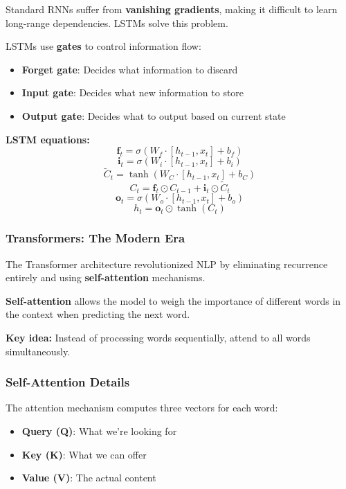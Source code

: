\documentclass[11pt,a4paper]{article}
\theoremstyle{definition}
\theoremstyle{plain}
\theoremstyle{remark}
\begin{document}
Standard RNNs suffer from \textbf{vanishing gradients}, making it difficult to learn long-range dependencies. LSTMs solve this problem.

\begin{tcolorbox}[colback=orange!5!white,colframe=orange!75!black,title=\textbf{LSTM Architecture}]
LSTMs use \textbf{gates} to control information flow:

\begin{itemize}
    \item \textbf{Forget gate}: Decides what information to discard
    \item \textbf{Input gate}: Decides what new information to store
    \item \textbf{Output gate}: Decides what to output based on current state
\end{itemize}

\textbf{LSTM equations:}
\[
\mathbf{f}_t = \sigma(W_f \cdot [h_{t-1}, x_t] + b_f)
\]
\[
\mathbf{i}_t = \sigma(W_i \cdot [h_{t-1}, x_t] + b_i)
\]
\[
\tilde{C}_t = \tanh(W_C \cdot [h_{t-1}, x_t] + b_C)
\]
\[
C_t = \mathbf{f}_t \odot C_{t-1} + \mathbf{i}_t \odot \tilde{C}_t
\]
\[
\mathbf{o}_t = \sigma(W_o \cdot [h_{t-1}, x_t] + b_o)
\]
\[
h_t = \mathbf{o}_t \odot \tanh(C_t)
\]
\end{tcolorbox}

\subsubsection{Transformers: The Modern Era}

The Transformer architecture revolutionized NLP by eliminating recurrence entirely and using \textbf{self-attention} mechanisms.

\begin{tcolorbox}[colback=purple!5!white,colframe=purple!75!black,title=\textbf{Attention Mechanism}]
\textbf{Self-attention} allows the model to weigh the importance of different words in the context when predicting the next word.

\textbf{Key idea:} Instead of processing words sequentially, attend to all words simultaneously.
\end{tcolorbox}

\subsubsection{Self-Attention Details}

The attention mechanism computes three vectors for each word:
\begin{itemize}
    \item \textbf{Query (Q)}: What we're looking for
    \item \textbf{Key (K)}: What we can offer
    \item \textbf{Value (V)}: The actual content
\end{itemize}
\end{document}
